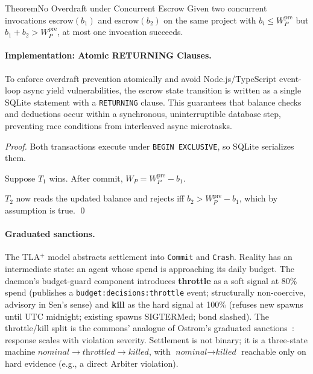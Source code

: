\documentclass[11pt,a4paper]{article}
\theoremstyle{definition}
\theoremstyle{remark}
\begin{document}
\begin{pdclaim}{Theorem}{No Overdraft under Concurrent Escrow}
\setlength{\parskip}{4pt plus 1pt}
\label{lem:no-overdraft}
Given two concurrent invocations $\mathrm{escrow}(b_1)$ and $\mathrm{escrow}(b_2)$ on the same project with $b_i \leq W_P^{\text{pre}}$ but $b_1 + b_2 > W_P^{\text{pre}}$, at most one invocation succeeds.
\end{pdclaim}

\paragraph{Implementation: Atomic RETURNING Clauses.}
To enforce overdraft prevention atomically and avoid Node.js/TypeScript event-loop async yield vulnerabilities, the escrow state transition is written as a single SQLite statement with a \texttt{RETURNING} clause. This guarantees that balance checks and deductions occur within a synchronous, uninterruptible database step, preventing race conditions from interleaved async microtasks.

\begin{proof}
\setlength{\parskip}{4pt plus 1pt}
Both transactions execute under \texttt{BEGIN EXCLUSIVE}, so SQLite serializes them. 

Suppose $T_1$ wins. After commit, $W_P = W_P^{\text{pre}} - b_1$. 

$T_2$ now reads the updated balance and rejects iff $b_2 > W_P^{\text{pre}} - b_1$, which by assumption is true. \qed
\end{proof}

\paragraph{Graduated sanctions.} The TLA$^{+}$ model abstracts settlement into \texttt{Commit} and \texttt{Crash}. Reality has an intermediate state: an agent whose spend is approaching its daily budget. The daemon's budget-guard component introduces \textbf{throttle} as a soft signal at 80\% spend (publishes a \texttt{budget:decisions:throttle} event; structurally non-coercive, advisory in Sen's sense) and \textbf{kill} as the hard signal at 100\% (refuses new spawns until UTC midnight; existing spawns SIGTERMed; bond slashed). The throttle/kill split is the commons' analogue of Ostrom's graduated sanctions~: response scales with violation severity. Settlement is not binary; it is a three-state machine $\textit{nominal} \to \textit{throttled} \to \textit{killed}$, with $\textit{nominal} \to \textit{killed}$ reachable only on hard evidence (e.g., a direct Arbiter violation).
\end{document}
